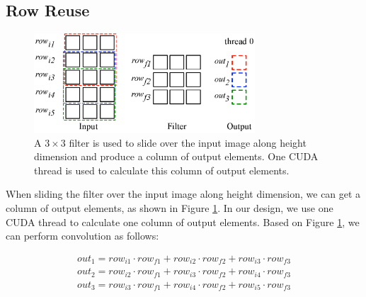 \documentclass[sigplan,review,anonymous]{acmart}\settopmatter{printfolios=true,printccs=false,printacmref=false}
\begin{document}
\subsection{Row Reuse}
\begin{figure}
	\centering
	\includegraphics[width=\columnwidth,height=3.7cm]{./figure/rowreuse.eps}
\caption{A $3 \times 3$ filter is used to slide over the input image along height dimension and produce a column of output elements. One CUDA thread is used to calculate this column of output elements.}
\label{fig:rowreuse}
\end{figure}

When sliding the filter over the input image along height dimension, we can get a column of output elements, as shown in Figure \ref{fig:rowreuse}. In our design, we use one CUDA thread to calculate one column of output elements. Based on Figure \ref{fig:rowreuse}, we can perform convolution as follows:

\begin{gather*}
  out_1=row_{i1} \cdot row_{f1} + row_{i2} \cdot row_{f2} + row_{i3} \cdot row_{f3} \\
out_{2}=row_{i2} \cdot row_{f1} + row_{i3} \cdot row_{f2} + row_{i4} \cdot row_{f3} \\
	out_{3}=row_{i3} \cdot row_{f1} + row_{i4} \cdot row_{f2} + row_{i5} \cdot row_{f3}
\end{gather*}
\end{document}
